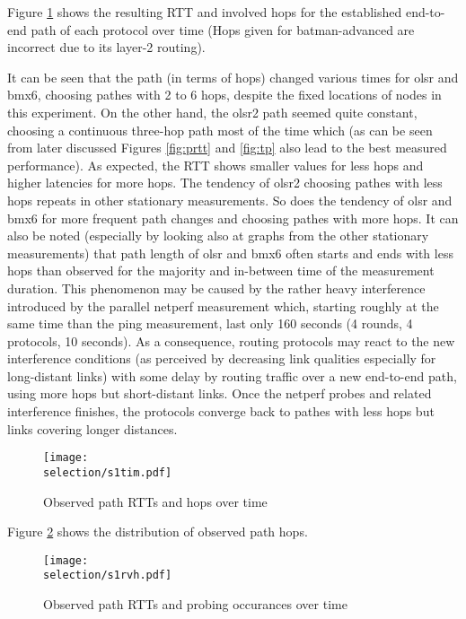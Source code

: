 \documentclass[a4paper,12pt,twoside]{article}
\begin{document}
Figure \ref{fig:ptim} shows the resulting RTT and involved hops for
the established end-to-end path of each protocol over time (Hops given
for batman-advanced are incorrect due to its layer-2 routing).

It can be seen that the path (in terms of hops) changed various times
for olsr and bmx6, choosing pathes with 2 to 6 hops, despite the fixed
locations of nodes in this experiment. On the other hand, the olsr2
path seemed quite constant, choosing a continuous three-hop path most
of the time which (as can be seen from later discussed Figures
\ref{fig:prtt} and \ref{fig:tp} also lead to the best measured
performance). As expected, the RTT shows smaller values for less hops
and higher latencies for more hops. The tendency of olsr2 choosing
pathes with less hops repeats in other stationary measurements. So
does the tendency of olsr and bmx6 for more frequent path changes and
choosing pathes with more hops. It can also be noted (especially by
looking also at graphs from the other stationary measurements) that
path length of olsr and bmx6 often starts and ends with less hops than
observed for the majority and in-between time of the measurement
duration.  This phenomenon may be caused by the rather heavy
interference introduced by the parallel netperf measurement which,
starting roughly at the same time than the ping measurement, last only
160 seconds (4 rounds, 4 protocols, 10 seconds). As a consequence,
routing protocols may react to the new interference conditions (as
perceived by decreasing link qualities especially for long-distant
links) with some delay by routing traffic over a new end-to-end path,
using more hops but short-distant links.  Once the netperf probes and
related interference finishes, the protocols converge back to pathes
with less hops but links covering longer distances.

\begin{figure}[!ht]
\centering
\texttt{[image: \\selection/s1tim.pdf]}
\caption{Observed path RTTs and hops over time }
\label{fig:ptim}
\end{figure}

Figure \ref{fig:prvh} shows the distribution of observed path hops.

\begin{figure}[!ht]
\centering
\texttt{[image: \\selection/s1rvh.pdf]}
\caption{Observed path RTTs and probing occurances over time }
\label{fig:prvh}
\end{figure}
\end{document}
